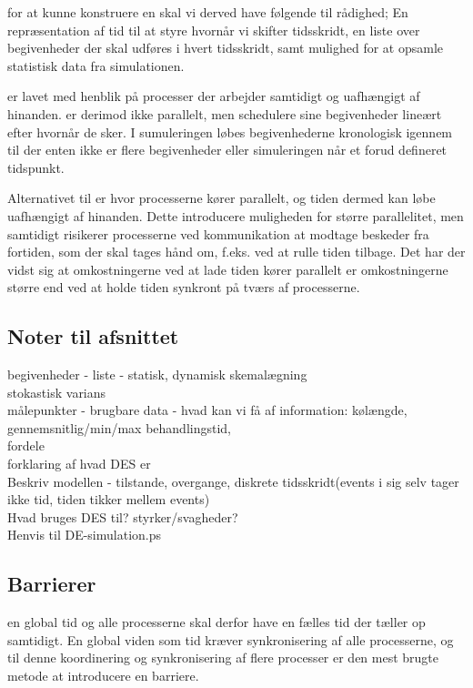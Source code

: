 for at kunne konstruere en \des skal vi derved have følgende til rådighed; En repræsentation af tid til at styre hvornår vi skifter tidsskridt, en liste over begivenheder der skal udføres i hvert tidsskridt, samt mulighed for at opsamle statistisk data fra simulationen. 

    
\csp er lavet med henblik på processer der arbejder samtidigt og uafhængigt af hinanden. \Des er derimod ikke parallelt, men schedulere sine begivenheder lineært efter hvornår de sker. I sumuleringen løbes begivenhederne kronologisk igennem til der enten ikke er flere begivenheder eller simuleringen når et forud defineret tidspunkt.

Alternativet til  \des  er \pdes{} hvor processerne kører parallelt, og  tiden dermed kan løbe uafhængigt af hinanden. Dette introducere muligheden for større parallelitet, men samtidigt risikerer processerne ved kommunikation at modtage beskeder fra fortiden, som der skal tages hånd om, f.eks. ved at rulle tiden tilbage. Det har der vidst sig at omkostningerne ved at lade tiden kører parallelt er omkostningerne større end ved at holde tiden synkront på tværs af processerne.

\subsection*{Noter til afsnittet}
begivenheder - liste - statisk, dynamisk skemalægning \\
stokastisk varians\\
målepunkter - brugbare data - hvad kan vi få af information: kølængde, gennemsnitlig/min/max behandlingstid, \\
fordele\\
forklaring af hvad DES er\\
Beskriv modellen - tilstande, overgange, diskrete tidsskridt(events i sig selv tager ikke tid, tiden tikker mellem events)\\
Hvad bruges DES til? styrker/svagheder?\\
Henvis til DE-simulation.ps\\

\subsection{Barrierer} \label{sec:barrierer}
  en 
global tid og alle processerne skal derfor have en fælles tid der tæller op 
samtidigt.  En global viden som tid kræver synkronisering af alle 
processerne, og til denne koordinering og synkronisering af flere 
processer er den mest brugte metode at introducere en barriere.

